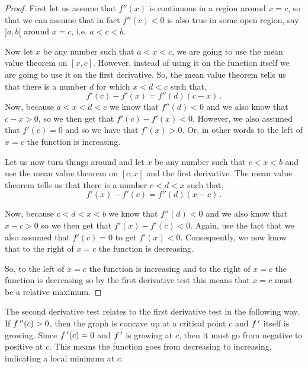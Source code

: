 \begin{proof}
First let us assume that $f''(x)$ is continuous in a region around $x=c$, so that we can assume that in fact $f''(c)<0$ is also true in some open region, say $]a,b[$ around $x=c$, i.e. $a<c<b$.

Now let $x$ be any number such that $a<x<c$, we are going to use the mean value theorem on $[x,c]$. However, instead of using it on the function itself we are going to use it on the first derivative. So, the mean value theorem tells us that there is a number $d$ for which $x<d<c$ such that,
$$
f'\left( c \right) - f'\left( x \right) = f''\left( d \right)\left( {c - x} \right)\,.
$$
Now, because $a<x<d<c$ we know that $f''(d)<0$ and we also know that $c-x>0$, so we then get that 
$f'(c)-f'(x)<0$. However, we also assumed that $f'(c)=0$ and so we have that $f'(x)>0$. Or, in other words to the left of $x=c$ the function is increasing.

Let us now turn things around and let $x$
be any number such that  $c<x<b$ and use the mean value theorem on $[c,x]$ and the first derivative. The mean value theorem tells us that there is a number $c<d<x$ such that,
$$
f'\left( x \right) - f'\left( c \right) = f''\left( d \right)\left( {x - c} \right)\,.
$$

Now, because $c<d<x<b$ we know that $f''(d)<0$ and we also know that $x-c>0$ so we then get that 
$f'(x)-f'(c)<0$.  Again, use the fact that we also assumed that $f'(c)=0$ to get $f'(x)<0$. Consequently, we now know that to the right of $x=c$
the function is decreasing.

So, to the left of $x=c$ the function is increasing and to the right of $x=c$ the function is decreasing so by the first derivative test this means that $x=c$ must be a relative maximum.
\end{proof}

\fi

The second derivative test relates to the first derivative test in the following way. If $f\,''(c)>0$, then the graph is concave up at a critical point $c$ and $f\,'$ itself is growing.  Since $f\,'(c)=0$ and $f\,'$ is growing at $c$, then it must go from negative to positive at $c$.  This means the function goes from decreasing to increasing, indicating a local minimum at $c$.

